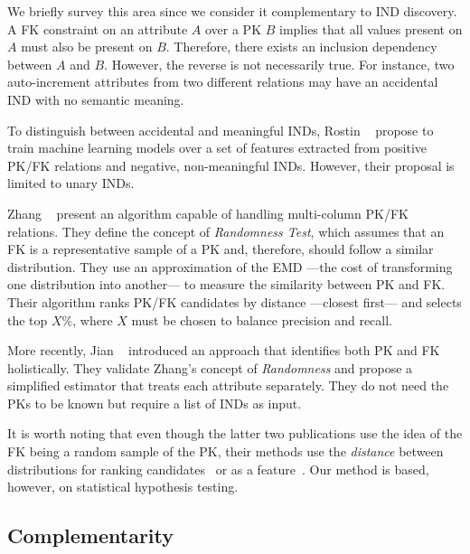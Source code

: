 We briefly survey this area since we consider it complementary to
\gls{IND} discovery. A \gls{FK} constraint on an attribute
$A$ over a \gls{PK} $B$ implies that all values present on $A$ must also be
present on $B$.
Therefore, there exists an inclusion dependency between $A$ and $B$.
However, the reverse is not necessarily true. For instance, two auto-increment attributes from
two different relations may have an accidental \gls{IND} with no semantic meaning.

To distinguish between accidental and meaningful \glspl{IND}, Rostin \etal~\cite{Rostin2009} propose to
train machine learning models over a set of features extracted from positive
\gls{PK}/\gls{FK} relations and negative, non-meaningful \glspl{IND}. However, their proposal
is limited to unary \glspl{IND}.

Zhang \etal~\cite{Zhang2010} present an algorithm capable of handling multi-column
\gls{PK}/\gls{FK} relations.
They define the concept of \emph{Randomness Test}, which assumes that an \gls{FK} is a representative
sample of a \gls{PK} and, therefore, should follow a similar distribution.
They use an approximation of the \gls{EMD} ---the cost of transforming one distribution into another---
to measure the similarity between \gls{PK} and \gls{FK}.
Their algorithm ranks \gls{PK}/\gls{FK} candidates by distance ---closest first--- and selects
the top $X\%$, where $X$ must be chosen to balance precision and recall.

More recently, Jian \etal~\cite{jiang_holistic_2020} introduced an approach that identifies
both \gls{PK} and \gls{FK} holistically. They validate Zhang's concept of \emph{Randomness}
and propose a simplified estimator that treats each attribute separately. They do not need
the \glspl{PK} to be known but require a list of \glspl{IND} as input.

It is worth noting that even though the latter two publications use the idea of the
\gls{FK} being a random sample of the \gls{PK}, their methods use the \emph{distance} between
distributions for ranking candidates~\cite{Zhang2010} or as a feature~\cite{jiang_holistic_2020}.
Our method is based, however, on statistical hypothesis testing\footnotemark.


\subsection{Complementarity}

